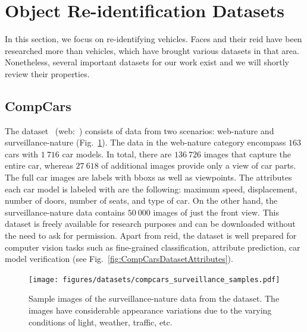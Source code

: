 \section{Object Re-identification Datasets}
\label{sec:ObjectReIDDatasets}

In this section, we focus on re-identifying vehicles. Faces and their \gls{reid} have been researched more than vehicles, which have brought various datasets in that area. Nonetheless, several important datasets for our work exist and we will shortly review their properties.

\subsection{CompCars}
\label{ssec:DatasetCompCars}

The  dataset~\cite{yang2015compcars} (web:~\cite{webcompcarsdataset}) consists of data from two scenarios: web-nature and surveillance-nature (Fig.~\ref{fig:CompCarsDatasetSurveillance}). The data in the web-nature category encompass $163$ cars with $1\ 716$ car models. In total, there are $136\ 726$ images that capture the entire car, whereas $27\ 618$ of additional images provide only a view of car parts. The full car images are labels with \glspl{bbox} as well as viewpoints. The attributes each car model is labeled with are the following: maximum speed, displacement, number of doors, number of seats, and type of car. On the other hand, the surveillance-nature data contains $50\ 000$ images of just the front view. This dataset is freely available for research purposes and can be downloaded without the need to ask for permission. Apart from \gls{reid}, the dataset is well prepared for computer vision tasks such as fine-grained classification, attribute prediction, car model verification (see Fig.~\ref{fig:CompCarsDatasetAttributes}).

\begin{figure}[t]
    \centerline{\texttt{[image: figures/datasets/compcars\_surveillance\_samples.pdf]}}
    \caption[ dataset]{Sample images of the surveillance-nature data from the  dataset. The images have considerable appearance variations due to the varying conditions of light, weather, traffic, etc. }
    \label{fig:CompCarsDatasetSurveillance}
\end{figure}

